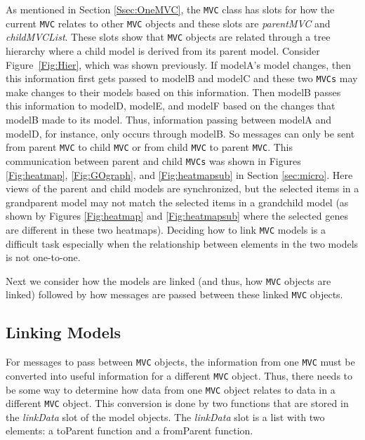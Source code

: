 \documentclass{article}[11pt]
\newcommand{\Rfunction}[1]{{\textsf{#1}}}
\newcommand{\Robject}[1]{{\texttt{#1}}}
\newcommand{\Rslot}[1]{\textsl{#1}}
\newcommand{\Rclass}[1]{\texttt{#1}}
\begin{document}
As mentioned in Section \ref{Ssec:OneMVC}, the \Rclass{MVC} class has slots
for how the current \Robject{MVC} relates to other \Robject{MVC} objects and
these slots are \Rslot{parentMVC} and \Rslot{childMVCList}.  These slots show
that \Robject{MVC} objects are related through a tree hierarchy where a child
model is derived from its parent model.  
Consider Figure~\ref{Fig:Hier}, which was shown previously.  If
modelA's model changes, then this information first gets passed to
modelB and modelC and these two \Robject{MVCs} may make changes to
their models based on this information.  Then modelB passes this
information to modelD, modelE, and modelF based on the changes
that modelB made to its model.  Thus, information passing between
modelA and modelD, for instance, only occurs through modelB.  So
messages can only be sent from parent \Robject{MVC} to child
\Robject{MVC} or from child \Robject{MVC} to parent \Robject{MVC}.
This communication between parent and child \Robject{MVCs} was shown in Figures
\ref{Fig:heatmap}, \ref{Fig:GOgraph}, and \ref{Fig:heatmapsub} in Section
\ref{sec:micro}.  Here views of the parent and child models are
synchronized, but the selected items in a grandparent model may not
match the selected items in a grandchild model (as shown by Figures
\ref{Fig:heatmap} and \ref{Fig:heatmapsub} where the selected genes are
different in these two heatmaps).  Deciding how to link \Robject{MVC} models 
is a difficult task especially when the relationship between elements in the 
two models is not one-to-one.

Next we consider how the models are linked (and thus, how \Robject{MVC}
objects are linked) followed by how messages are passed between these
linked \Robject{MVC} objects. 

\subsection{Linking Models}
\label{Ssec:MultLink}

For messages to pass between \Robject{MVC} objects, the information from one
\Robject{MVC} must be converted into useful information for a different
\Robject{MVC} object.  Thus, there needs to be some way to determine how data
from one \Robject{MVC} object relates to data in a different \Robject{MVC}
object.  This conversion is done by two functions that are stored in the
\Rslot{linkData} slot of the model objects.  The \Rslot{linkData}
slot is a list with two elements: a \Rfunction{toParent} function and a
\Rfunction{fromParent} function. 
\end{document}
